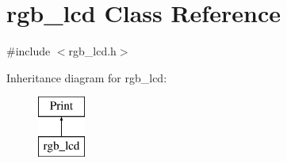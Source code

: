 \hypertarget{classrgb__lcd}{}\section{rgb\+\_\+lcd Class Reference}
\label{classrgb__lcd}


{\ttfamily \#include $<$rgb\+\_\+lcd.\+h$>$}

Inheritance diagram for rgb\+\_\+lcd\+:\begin{figure}[H]
\begin{center}
\leavevmode
\includegraphics[height=2.000000cm]{classrgb__lcd}
\end{center}
\end{figure}
